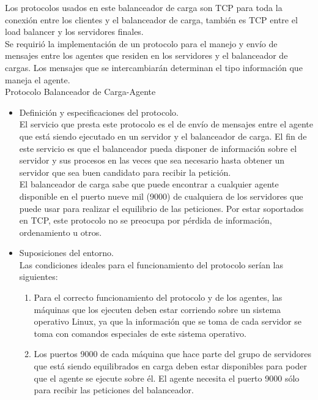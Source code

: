 Los protocolos usados en este balanceador de carga son TCP para toda la conexión entre los clientes y el balanceador de carga, también es TCP entre
el load balancer y los servidores finales.\\
Se requirió la implementación de un protocolo para el manejo y envío de mensajes entre los agentes que residen en los servidores y el balanceador
 de cargas. Los mensajes que se intercambiarán determinan el tipo información que maneja el agente.\\
 
 Protocolo Balanceador de Carga-Agente
 
 \begin{itemize}
 \item Definición y especificaciones del protocolo.\\
El servicio que presta este protocolo es el de envío de mensajes entre el agente que está siendo ejecutado en un servidor y el balanceador de carga.
El fin de este servicio es que el balanceador pueda disponer de información sobre el servidor y sus procesos en las veces que sea necesario hasta
obtener un servidor que sea buen candidato para recibir la petición.\\
El balanceador de carga sabe que puede encontrar a cualquier agente disponible en el puerto nueve mil (9000) de cualquiera de los servidores
que puede usar para realizar el equilibrio de las peticiones.
Por estar soportados en TCP, este protocolo no se preocupa por pérdida de información, ordenamiento u otros.
  \item Suposiciones del entorno.\\
  Las condiciones ideales para el funcionamiento del protocolo serían las siguientes:
  \begin{enumerate}

\item Para el correcto funcionamiento del protocolo y de los agentes, las máquinas que los ejecuten deben estar corriendo sobre un sistema operativo
Linux, ya que la información que se toma de cada servidor se toma con comandos especiales de este sistema operativo.

\item Los puertos 9000 de cada máquina que hace parte del grupo de servidores que está siendo equilibrados en carga deben estar disponibles
para poder que el agente se ejecute sobre él. El agente necesita el puerto 9000 sólo para recibir las peticiones del balanceador.

\end{enumerate}


\end{itemize}
